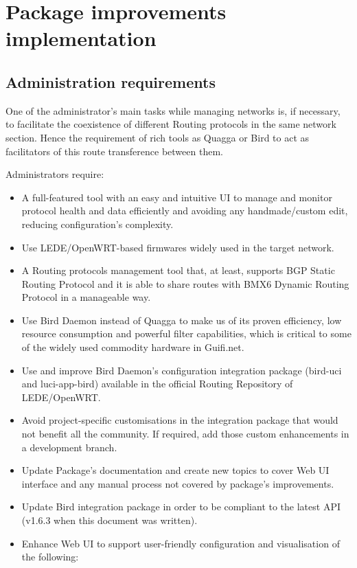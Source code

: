 \chapter{Package improvements implementation}
\label{ch:implementation}
\pagestyle{headings}

\section{Administration requirements}
One of the administrator's main tasks while managing networks is, if necessary, to facilitate the coexistence of different Routing protocols in the same network section. Hence the requirement of rich tools as Quagga or Bird to act as facilitators of this route transference between them.

Administrators require:
\begin{itemize}
    \item A full-featured tool with an easy and intuitive UI to manage and monitor protocol health and data efficiently and avoiding any handmade/custom edit, reducing configuration's complexity.
    \item Use LEDE/OpenWRT-based firmwares widely used in the target network.
    \item A Routing protocols management tool that, at least, supports BGP Static Routing Protocol and it is able to share routes with BMX6 Dynamic Routing Protocol in a manageable way.
    \item Use Bird Daemon instead of Quagga to make us of its proven efficiency, low resource consumption and powerful filter capabilities, which is critical to some of the widely used commodity hardware in Guifi.net.
    \item Use and improve Bird Daemon's configuration integration package (bird-uci and luci-app-bird) available in the official Routing Repository of LEDE/OpenWRT.
    \item Avoid project-specific customisations in the integration package that would not benefit all the community. If required, add those custom enhancements in a development branch.
    \item Update Package's documentation and create new topics to cover Web UI interface and any manual process not covered by package's improvements.
    \item Update Bird integration package in order to be compliant to the latest API (v1.6.3 when this document was written).
    \item Enhance Web UI to support user-friendly configuration and visualisation of the following:

\end{itemize}
